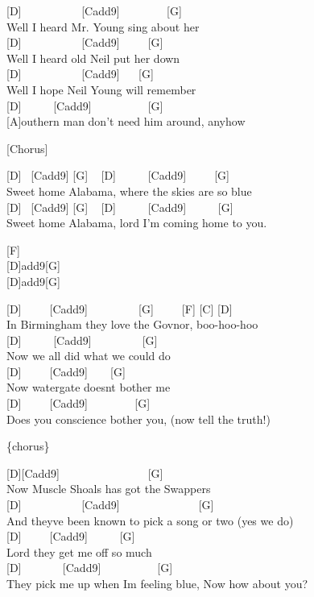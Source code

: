 \documentclass[
  letterpaper,
  twoside=false]{scrbook}
\begin{document}
{[}D{]} ~ ~ ~ ~ ~ ~ {[}Cadd9{]} ~ ~ ~ ~ ~{[}G{]}\\
Well I heard Mr. Young sing about her\\
{[}D{]} ~ ~ ~ ~ ~ ~ {[}Cadd9{]} ~ ~ ~{[}G{]}\\
Well I heard old Neil put her down\\
{[}D{]} ~ ~ ~ ~ ~ ~ {[}Cadd9{]} ~ ~{[}G{]}\\
Well I hope Neil Young will remember\\
{[}D{]} ~ ~ ~ {[}Cadd9{]} ~ ~ ~ ~ ~ ~{[}G{]} ~ ~ ~ ~ ~ ~ ~\\
{[}A{]}outhern man don't need him around, anyhow

{[}Chorus{]}

{[}D{]} ~{[}Cadd9{]} {[}G{]} ~ {[}D{]} ~ ~ ~ {[}Cadd9{]} ~ ~ ~{[}G{]} ~
~ ~ ~\\
Sweet home Alabama, where the skies are so blue\\
{[}D{]} ~{[}Cadd9{]} {[}G{]} ~ {[}D{]} ~ ~ ~ {[}Cadd9{]} ~ ~ ~ {[}G{]} ~
~\\
Sweet home Alabama, lord I'm coming home to you.

{[}F{]}\\
{[}D{]}add9{[}G{]}\\
{[}D{]}add9{[}G{]}

{[}D{]} ~ ~ ~{[}Cadd9{]} ~ ~ ~ ~ ~ {[}G{]} ~ ~ ~{[}F{]} {[}C{]}
{[}D{]}\\
In Birmingham they love the Gov\textquotesingle nor, boo-hoo-hoo\\
{[}D{]} ~ ~ ~ {[}Cadd9{]} ~ ~ ~ ~ ~ {[}G{]}\\
Now we all did what we could do\\
{[}D{]} ~ ~ ~{[}Cadd9{]} ~ ~ {[}G{]}\\
Now watergate doesn\textquotesingle t bother me\\
{[}D{]} ~ ~ ~{[}Cadd9{]} ~ ~ ~ ~ ~{[}G{]}\\
Does you conscience bother you, (now tell the truth!)

\{chorus\}

{[}D{]}{[}Cadd9{]} ~ ~ ~ ~ ~ ~ ~ ~ ~ {[}G{]}\\
Now Muscle Shoals has got the Swappers\\
{[}D{]} ~ ~ ~ ~ ~ ~ {[}Cadd9{]} ~ ~ ~ ~ ~ ~ ~ ~ {[}G{]}\\
And they\textquotesingle ve been known to pick a song or two (yes we
do)\\
{[}D{]} ~ ~ ~{[}Cadd9{]} ~ ~ ~ {[}G{]}\\
Lord they get me off so much\\
{[}D{]} ~ ~ ~ ~ {[}Cadd9{]} ~ ~ ~ ~ ~ ~{[}G{]} ~\\
They pick me up when I\textquotesingle m feeling blue, Now how about
you?
\end{document}
